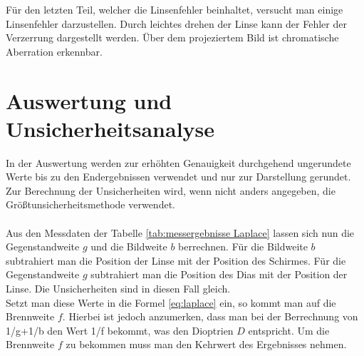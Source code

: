 \documentclass[12pt,a4paper,twoside]{article}
\begin{document}
\noindent
Für den letzten Teil, welcher die Linsenfehler beinhaltet, versucht man einige Linsenfehler darzustellen. Durch leichtes drehen der Linse kann der Fehler der Verzerrung dargestellt werden. Über dem projeziertem Bild ist chromatische Aberration erkennbar. 

\section{Auswertung und Unsicherheitsanalyse} %

In der Auswertung werden zur erhöhten Genauigkeit durchgehend ungerundete Werte bis zu den Endergebnissen verwendet und nur zur Darstellung gerundet. \\
Zur Berechnung der Unsicherheiten wird, wenn nicht anders angegeben, die Größtunsicherheitsmethode verwendet.
\\
\\
Aus den Messdaten der Tabelle \ref{tab:messergebnisse Laplace} lassen sich nun die Gegenstandweite $g$ und die Bildweite $b$ berrechnen. 
Für die Bildweite $b$ subtrahiert man die Position der Linse mit der Position des Schirmes. Für die Gegenstandweite $g$ subtrahiert man die Position des Dias mit der Position der Linse. Die Unsicherheiten sind in diesen Fall gleich. 
\\
Setzt man diese Werte in die Formel \ref{eq:laplace} ein, so kommt man auf die Brennweite $f$. Hierbei ist jedoch anzumerken, dass man bei der Berrechnung von 1/g+1/b den Wert 1/f bekommt, was den Dioptrien $D$ entspricht. Um die Brennweite $f$ zu bekommen muss man den Kehrwert des Ergebnisses nehmen. 
\end{document}
